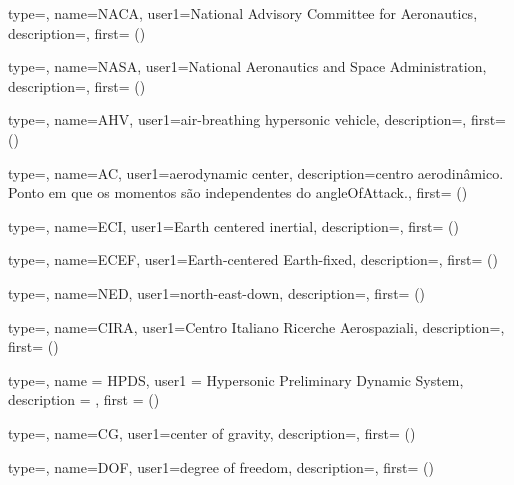 {type=\acronymtype,
    name={NACA},
    user1={National Advisory Committee for Aeronautics},
    description={},
    first={ ()}
}

{type=\acronymtype,
    name={NASA},
    user1={National Aeronautics and Space Administration},
    description={},
    first={ ()}
}


{type=\acronymtype,
    name={AHV},
    user1={air-breathing hypersonic vehicle},
    description={},
    first={ ()}
}

{type=\acronymtype,
    name={AC},
    user1={aerodynamic center},
    description={centro aerodinâmico. Ponto em que os momentos são independentes do \gls{angleOfAttack}.},
    first={ ()}
}

{type=\acronymtype,
    name={ECI},
    user1={Earth centered inertial},
    description={},
    first={ ()}
}

{type=\acronymtype,
    name={ECEF},
    user1={Earth-centered Earth-fixed},
    description={},
    first={ ()}
}

{type=\acronymtype,
    name={NED},
    user1={north-east-down},
    description={},
    first={ ()}
}

{type=\acronymtype,
    name={CIRA},
    user1={Centro Italiano Ricerche Aerospaziali},
    description={},
    first={ ()}
}

{type=\acronymtype,
    name = {HPDS},
    user1 = {Hypersonic Preliminary Dynamic System},
    description = {},
    first = { ()}
}

{type=\acronymtype,
    name={CG},
    user1={center of gravity},
    description={},
    first={ ()}
}

{type=\acronymtype,
    name={DOF},
    user1={degree of freedom},
    description={},
    first={ ()}
}